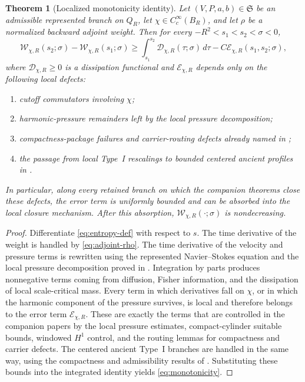 \documentclass[11pt]{amsart}
\numberwithin{equation}{section}
\theoremstyle{plain}
\newtheorem{theorem}{Theorem}[section]
\theoremstyle{definition}
\theoremstyle{remark}
\newcommand{\Wloc}{\mathcal W}
\newcommand{\Diss}{\mathcal D}
\newcommand{\Err}{\mathcal E}
\newcommand{\State}{\mathfrak S}
\begin{document}
\begin{theorem}[Localized monotonicity identity]
\label{thm:local-monotonicity}
Let \((V,P,a,b)\in\State\) be an admissible represented branch on \(Q_R\),
let \(\chi\in C_c^\infty(B_R)\), and let \(\rho\) be a normalized backward
adjoint weight.  Then for every \(-R^2<s_1<s_2<\sigma<0\),
\begin{equation}\label{eq:monotonicity}
	\Wloc_{\chi,R}(s_2;\sigma)-\Wloc_{\chi,R}(s_1;\sigma)
	\ge
	\int_{s_1}^{s_2}\Diss_{\chi,R}(\tau;\sigma)\,d\tau
	- C\Err_{\chi,R}(s_1,s_2;\sigma),
\end{equation}
where \(\Diss_{\chi,R}\ge0\) is a dissipation functional and
\(\Err_{\chi,R}\) depends only on the following local defects:
\begin{enumerate}[label=\textup{(\roman*)},leftmargin=2.2em]
	\item cutoff commutators involving \(\chi\);
	\item harmonic-pressure remainders left by the local pressure decomposition;
	\item compactness-package failures and carrier-routing defects already named
	in \cite{BallesterTypeII};
	\item the passage from local Type~I rescalings to bounded centered ancient
	profiles in \cite{BallesterSetup}.
\end{enumerate}
In particular, along every retained branch on which the companion theorems
close these defects, the error term is uniformly bounded and can be absorbed
into the local closure mechanism.  After this absorption,
\(\Wloc_{\chi,R}(\cdot;\sigma)\) is nondecreasing.
\end{theorem}

\begin{proof}
Differentiate \eqref{eq:entropy-def} with respect to \(s\).  The time
derivative of the weight is handled by \eqref{eq:adjoint-rho}.  The time
derivative of the velocity and pressure terms is rewritten using the
represented Navier--Stokes equation and the local pressure decomposition proved
in \cite{BallesterTypeII}.  Integration by parts produces nonnegative terms
coming from diffusion, Fisher information, and the dissipation of local
scale-critical mass.  Every term in which derivatives fall on \(\chi\), or in
which the harmonic component of the pressure survives, is local and therefore
belongs to the error term \(\Err_{\chi,R}\).  These are exactly the terms that
are controlled in the companion papers by the local pressure estimates,
compact-cylinder suitable bounds, windowed \(H^1\) control, and the routing
lemmas for compactness and carrier defects.  The centered ancient Type~I
branches are handled in the same way, using the compactness and admissibility
results of \cite{BallesterSetup}.  Substituting these bounds into the
integrated identity yields \eqref{eq:monotonicity}.
\end{proof}
\end{document}
